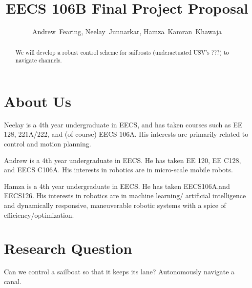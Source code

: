 \documentclass[conference]{IEEEtran}
\begin{document}
\title{EECS 106B Final Project Proposal}
\author{Andrew~Fearing, Neelay~Junnarkar,  Hamza~Kamran~Khawaja}
\maketitle


\begin{abstract}
We will develop a robust control scheme for sailboats (underactuated USV's ???) to navigate channels.
\end{abstract}


\section{About Us}
Neelay is a 4th year undergraduate in EECS, and has taken courses such as EE 128, 221A/222, and (of course) EECS 106A. His interests are primarily related to control and motion planning.

Andrew is a 4th year undergraduate in EECS. He has taken EE 120, EE C128, and EECS C106A. His interests in robotics are in micro-scale mobile robots.

Hamza is a 4th year undergraduate in EECS. He has taken EECS106A,and EECS126. His interests in robotics are in machine learning/ artificial intelligence and dynamically responsive, maneuverable robotic systems with a spice of efficiency/optimization.
\section{Research Question}
Can we control a sailboat so that it keeps its lane? Autonomously navigate a canal.
\end{document}
